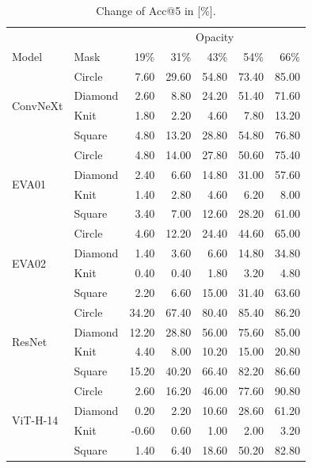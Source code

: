 \documentclass[a4paper, oneside]{discothesis}
\begin{document}
\begin{table}[h]
\begin{minipage}{0.48\textwidth}
    \end{minipage}%
    \hfill
    \begin{minipage}{0.48\textwidth}
        \centering

        \begin{tabular}{ll|rrrrr}
            \multicolumn{2}{c|}{} & \multicolumn{5}{c}{Opacity} \\
            Model & Mask &  19\% & 31\% & 43\% & 54\% & 66\% \\
            \midrule
            \multirow{4}{*}{ConvNeXt} & Circle & 7.60 & 29.60 & 54.80 & 73.40 & 85.00 \\
             & Diamond & 2.60 & 8.80 & 24.20 & 51.40 & 71.60 \\
             & Knit & 1.80 & 2.20 & 4.60 & 7.80 & 13.20 \\
             & Square & 4.80 & 13.20 & 28.80 & 54.80 & 76.80 \\\midrule
            \multirow{4}{*}{EVA01} & Circle & 4.80 & 14.00 & 27.80 & 50.60 & 75.40 \\
             & Diamond & 2.40 & 6.60 & 14.80 & 31.00 & 57.60 \\
             & Knit & 1.40 & 2.80 & 4.60 & 6.20 & 8.00 \\
             & Square & 3.40 & 7.00 & 12.60 & 28.20 & 61.00 \\\midrule
            \multirow{4}{*}{EVA02} & Circle & 4.60 & 12.20 & 24.40 & 44.60 & 65.00 \\
             & Diamond & 1.40 & 3.60 & 6.60 & 14.80 & 34.80 \\
             & Knit & 0.40 & 0.40 & 1.80 & 3.20 & 4.80 \\
             & Square & 2.20 & 6.60 & 15.00 & 31.40 & 63.60 \\\midrule
            \multirow{4}{*}{ResNet} & Circle & 34.20 & 67.40 & 80.40 & 85.40 & 86.20 \\
             & Diamond & 12.20 & 28.80 & 56.00 & 75.60 & 85.00 \\
             & Knit & 4.40 & 8.00 & 10.20 & 15.00 & 20.80 \\
             & Square & 15.20 & 40.20 & 66.40 & 82.20 & 86.60 \\\midrule
            \multirow{4}{*}{ViT-H-14} & Circle & 2.60 & 16.20 & 46.00 & 77.60 & 90.80 \\
             & Diamond & 0.20 & 2.20 & 10.60 & 28.60 & 61.20 \\
             & Knit & -0.60 & 0.60 & 1.00 & 2.00 & 3.20 \\
             & Square & 1.40 & 6.40 & 18.60 & 50.20 & 82.80 
        \end{tabular}
        \vspace*{0.1cm}
        \caption{Change of Acc@5 in [\%].}
        \label{tab:drop-acc5}

    \end{minipage}
\end{table}
\end{document}
